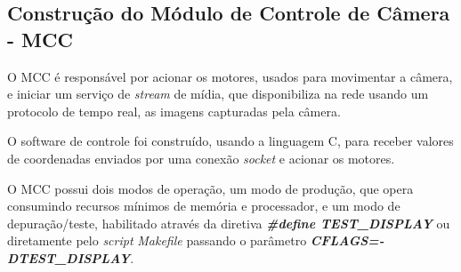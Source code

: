 \subsection{Construção do Módulo de Controle de Câmera - MCC}
\label{subsec:assemmodconcam}

O MCC é responsável por acionar os motores, usados para movimentar a câmera, e iniciar um serviço de \textit{stream} de mídia, que disponibiliza na rede usando um protocolo de tempo real, as imagens capturadas pela câmera.\par

O software de controle foi construído, usando a linguagem C, para receber valores de coordenadas enviados por uma conexão \textit{socket} e acionar os motores.\par

O MCC possui dois modos de operação, um modo de produção, que opera consumindo recursos mínimos de memória e processador, e um modo de depuração/teste, habilitado através da diretiva \textbf{\textit{\#define TEST\_DISPLAY}} ou diretamente pelo \textit{script} \textit{Makefile} passando o parâmetro \textbf{\textit{CFLAGS=-DTEST\_DISPLAY}}.
